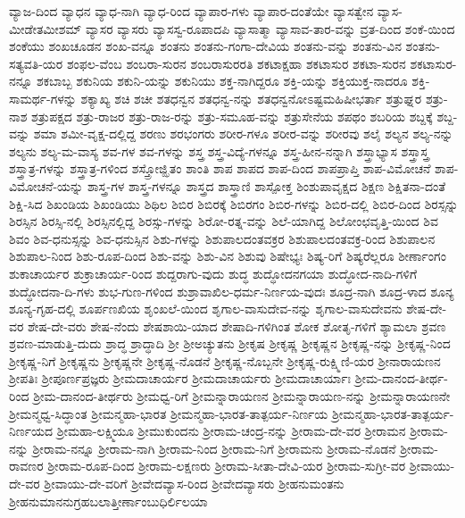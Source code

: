 {ವ್ಯಾಜ-ದಿಂದ
ವ್ಯಾಧನ
ವ್ಯಾಧ-ನಾಗಿ
ವ್ಯಾಧ-ರಿಂದ
ವ್ಯಾಪಾರ-ಗಳು
ವ್ಯಾಪಾರ-ದಂತೆಯೇ
ವ್ಯಾಸತ್ವೇನ
ವ್ಯಾಸ-ಮೀಡೇತಮೀಶಮ್
ವ್ಯಾಸರ
ವ್ಯಾಸರು
ವ್ಯಾಸಸ್ವ-ರೂಪಾದಪಿ
ವ್ಯಾಸಾತ್ಮಾ
ವ್ಯಾಸಾವ-ತಾರ-ವನ್ನು
ವ್ರತ-ದಿಂದ
ಶಂಕೆ-ಯಿಂದ
ಶಂಕೆಯು
ಶಂಖಚೂಡನ
ಶಂಖ-ವನ್ನೂ
ಶಂತನು
ಶಂತನು-ಗಂಗಾ-ದೇವಿಯ
ಶಂತನು-ವನ್ನು
ಶಂತನು-ವಿನ
ಶಂತನು-ಸತ್ಯವತಿ-ಯರ
ಶಂಫಲ-ವೆಂಬ
ಶಂಬರಾ-ಸುರನ
ಶಂಬರಾಸುರರತಿ
ಶಕಟಾಕ್ಷಹಾ
ಶಕಟಾಸುರ
ಶಕಟಾ-ಸುರನ
ಶಕಟಾಸುರ-ನನ್ನೂ
ಶಕಬಾಬ್ಬ
ಶಕುನಿಯ
ಶಕುನಿ-ಯನ್ನು
ಶಕುನಿಯು
ಶಕ್ತ-ನಾಗಿದ್ದರೂ
ಶಕ್ತಿ-ಯನ್ನು
ಶಕ್ತಿಯುಕ್ತ-ನಾದರೂ
ಶಕ್ತಿ-ಸಾಮರ್ಥ-ಗಳನ್ನು
ಶಕ್ಯಾಖ್ಯ
ಶಚಿ
ಶಚೀ
ಶತಧನ್ವನ
ಶತಧನ್ವ-ನನ್ನು
ಶತಧನ್ವನೋಽಷ್ಟಮಹಿಷೀಭರ್ತಾ
ಶತ್ರುಘ್ನರ
ಶತ್ರು-ನಾಶ
ಶತ್ರುಪಕ್ಷದ
ಶತ್ರು-ರಾಜರ
ಶತ್ರು-ರಾಜ-ರನ್ನು
ಶತ್ರು-ಸಮೂಹ-ವನ್ನು
ಶತ್ರುಸೇನೆಯ
ಶಪಥಂ
ಶಬರಿಯ
ಶಬ್ದಕ್ಕೆ
ಶಬ್ದ-ವನ್ನು
ಶಮಾ
ಶಮೀ-ವೃಕ್ಷ-ದಲ್ಲಿದ್ದ
ಶರಣು
ಶರಭಂಗರು
ಶರೀರ-ಗಳೂ
ಶರೀರ-ವನ್ನು
ಶರೀರವು
ಶಲೈ
ಶಲ್ಯನ
ಶಲ್ಯ-ನನ್ನು
ಶಲ್ಯನು
ಶಲ್ಯ-ಮ-ವಾಸ್ಯ
ಶವ-ಗಳ
ಶವ-ಗಳನ್ನು
ಶಸ್ತ್ರ
ಶಸ್ತ್ರ-ವಿದ್ಯೆ-ಗಳನ್ನೂ
ಶಸ್ತ್ರ-ಹೀನ-ನನ್ನಾಗಿ
ಶಸ್ತ್ರಾಭ್ಯಾಸ
ಶಸ್ತ್ರಾಸ್ತ್ರ
ಶಸ್ತ್ರಾತ್ರ-ಗಳನ್ನು
ಶಸ್ತ್ರಾತ್ರ-ಗಳಿಂದ
ಶಸ್ತ್ರೋಜ್ಝಿತಂ
ಶಾಂತಿ
ಶಾಪ
ಶಾಪದ
ಶಾಪ-ದಿಂದ
ಶಾಪಪ್ರಾಪ್ತಿ
ಶಾಪ-ವಿಮೋಚನೆ
ಶಾಪ-ವಿಮೋಚನೆ-ಯನ್ನು
ಶಾಸ್ತ್ರ-ಗಳ
ಶಾಸ್ತ್ರ-ಗಳನ್ನೂ
ಶಾಸ್ತ್ರದ
ಶಾಸ್ತ್ರಾಣಿ
ಶಾಸ್ಪೋಕ್ತ
ಶಿಂಶುಪಾವೃಕ್ಷದ
ಶಿಕ್ಷಣ
ಶಿಕ್ಷಿತನಾ-ದಂತೆ
ಶಿಕ್ಷಿ-ಸಿದ
ಶಿಖಂಡಿಯ
ಶಿಖಂಡಿಯು
ಶಿಥಿಲ
ಶಿಬಿರ
ಶಿಬಿರಕ್ಕೆ
ಶಿಬಿರಗಂ
ಶಿಬಿರ-ಗಳನ್ನು
ಶಿಬಿರ-ದಲ್ಲಿ
ಶಿಬಿರ-ದಿಂದ
ಶಿರಸ್ಸನ್ನು
ಶಿರಸ್ಸಿನ
ಶಿರಸ್ಸಿ-ನಲ್ಲಿ
ಶಿರಸ್ಸಿನಲ್ಲಿದ್ದ
ಶಿರಸ್ಸು-ಗಳನ್ನು
ಶಿರೋ-ರತ್ನ-ವನ್ನು
ಶಿಲೆ-ಯಾಗಿದ್ದ
ಶಿಲೋಂಛವೃತ್ತಿ-ಯಿಂದ
ಶಿವ
ಶಿವಂ
ಶಿವ-ಧನುಸ್ಸನ್ನು
ಶಿವ-ಧನುಸ್ಸಿನ
ಶಿಶು-ಗಳನ್ನು
ಶಿಶುಪಾಲದಂತವಕ್ರರ
ಶಿಶುಪಾಲದಂತವಕ್ರ-ರಿಂದ
ಶಿಶುಪಾಲನ
ಶಿಶುಪಾಲ-ನಿಂದ
ಶಿಶು-ರೂಪ-ದಿಂದ
ಶಿಶು-ವನ್ನು
ಶಿಶು-ವಿನ
ಶಿಶುವು
ಶಿಷೇಭ್ಯಃ
ಶಿಷ್ಯ-ರಿಗೆ
ಶಿಷ್ಯರೆಲ್ಲರೂ
ಶೀರ್ಣಾಂಗಂ
ಶುಕಾಚಾರ್ಯರ
ಶುಕ್ರಾಚಾರ್ಯ-ರಿಂದ
ಶುದ್ದರಾಗು-ವುದು
ಶುದ್ಧ
ಶುದ್ಧೋದನಗಯಾ
ಶುದ್ಧೋದ-ನಾದಿ-ಗಳಿಗೆ
ಶುದ್ಧೋದನಾ-ದಿ-ಗಳು
ಶುಭ-ಗುಣ-ಗಳಿಂದ
ಶುಶ್ರಾವಾಖಿಲ-ಧರ್ಮ-ನಿರ್ಣಯ-ವುದಃ
ಶೂದ್ರ-ನಾಗಿ
ಶೂದ್ರ-ಳಾದ
ಶೂನ್ಯ
ಶೂನ್ಯ-ಗೃಹ-ದಲ್ಲಿ
ಶೂರ್ಪಣಖಿಯ
ಶೃಂಖಲೆ-ಯಿಂದ
ಶೃಗಾಲ-ವಾಸುದೇವ-ನನ್ನು
ಶೃಗಾಲ-ವಾಸುದೇವನು
ಶೇಷ-ದೇ-ವರ
ಶೇಷ-ದೇ-ವರು
ಶೇಷ-ನೆಂದು
ಶೇಷಶಾಯಿ-ಯಾದ
ಶೇಷಾದಿ-ಗಳಿಗಿಂತ
ಶೋಕ
ಶೋತೃ-ಗಳಿಗೆ
ಶ್ಯಾಮಲಾ
ಶ್ರವಣ
ಶ್ರವಣ-ಮಾಡುತ್ತಿ-ದುದು
ಶ್ರಾದ್ಧ
ಶ್ರಾದ್ಧಾದಿ
ಶ್ರೀ
ಶ್ರೀಅಚ್ಯುತನು
ಶ್ರೀಕೃಷ
ಶ್ರೀಕೃಷ್ಣ
ಶ್ರೀಕೃಷ್ಣನ
ಶ್ರೀಕೃಷ್ಣ-ನನ್ನು
ಶ್ರೀಕೃಷ್ಣ-ನಿಂದ
ಶ್ರೀಕೃಷ್ಣ-ನಿಗೆ
ಶ್ರೀಕೃಷ್ಣನು
ಶ್ರೀಕೃಷ್ಣನೇ
ಶ್ರೀಕೃಷ್ಣ-ನೊಡನೆ
ಶ್ರೀಕೃಷ್ಣ-ನೊಬ್ಬನೇ
ಶ್ರೀಕೃಷ್ಣ-ರುಕ್ಷ್ಮಿಣಿ-ಯರ
ಶ್ರೀನಾರಾಯಣನ
ಶ್ರೀಪತಿಃ
ಶ್ರೀಪೂರ್ಣಪ್ರಜ್ಞರು
ಶ್ರೀಮದಾಚಾರ್ಯರ
ಶ್ರೀಮದಾಚಾರ್ಯರು
ಶ್ರೀಮದಾಚಾರ್ಯಾಃ
ಶ್ರೀಮ-ದಾನಂದ-ತೀರ್ಥ-ರಿಂದ
ಶ್ರೀಮ-ದಾನಂದ-ತೀರ್ಥರು
ಶ್ರೀಮಧ್ವ-ರಿಗೆ
ಶ್ರೀಮನ್ನಾರಾಯಣನ
ಶ್ರೀಮನ್ನಾರಾಯಣ-ನನ್ನು
ಶ್ರೀಮನ್ನಾರಾಯಣನೇ
ಶ್ರೀಮನ್ಮಧ್ವ-ಸಿದ್ಧಾಂತ
ಶ್ರೀಮನ್ಮಹಾ-ಭಾರತ
ಶ್ರೀಮನ್ಮಹಾ-ಭಾರತ-ತಾತ್ಪರ್ಯ-ನಿರ್ಣಯ
ಶ್ರೀಮನ್ಮಹಾ-ಭಾರತ-ತಾತ್ಪರ್ಯ-ನಿರ್ಣಯದ
ಶ್ರೀಮಹಾ-ಲಕ್ಷ್ಮಿಯೂ
ಶ್ರೀಮುಕುಂದನು
ಶ್ರೀರಾಮ-ಚಂದ್ರ-ನನ್ನು
ಶ್ರೀರಾಮ-ದೇ-ವರ
ಶ್ರೀರಾಮನ
ಶ್ರೀರಾಮ-ನನ್ನು
ಶ್ರೀರಾಮ-ನನ್ನೂ
ಶ್ರೀರಾಮ-ನಾಗಿ
ಶ್ರೀರಾಮ-ನಿಂದ
ಶ್ರೀರಾಮ-ನಿಗೆ
ಶ್ರೀರಾಮನು
ಶ್ರೀರಾಮ-ನೊಡನೆ
ಶ್ರೀರಾಮ-ರಾವಣರ
ಶ್ರೀರಾಮ-ರೂಪ-ದಿಂದ
ಶ್ರೀರಾಮ-ಲಕ್ಷಣರು
ಶ್ರೀರಾಮ-ಸೀತಾ-ದೇವಿ-ಯರ
ಶ್ರೀರಾಮ-ಸುಗ್ರೀ-ವರ
ಶ್ರೀವಾಯು-ದೇ-ವರ
ಶ್ರೀವಾಯು-ದೇ-ವರಿಗೆ
ಶ್ರೀವೇದವ್ಯಾಸ-ರಿಂದ
ಶ್ರೀವೇದವ್ಯಾಸರು
ಶ್ರೀಹನುಮಂತನು
ಶ್ರೀಹನುಮಾನನುಗ್ರಹಬಲಾತ್ತೀರ್ಣಾಂಬುಧಿರ್ಲಿಲಯಾ
}
